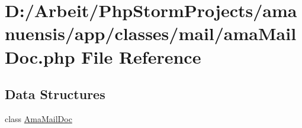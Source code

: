 \hypertarget{a00093}{}\section{D\+:/\+Arbeit/\+Php\+Storm\+Projects/amanuensis/app/classes/mail/ama\+Mail\+Doc.php File Reference}
\label{a00093}
\subsection*{Data Structures}
\begin{DoxyCompactItemize}
\item 
class \hyperlink{a00007}{Ama\+Mail\+Doc}
\end{DoxyCompactItemize}
